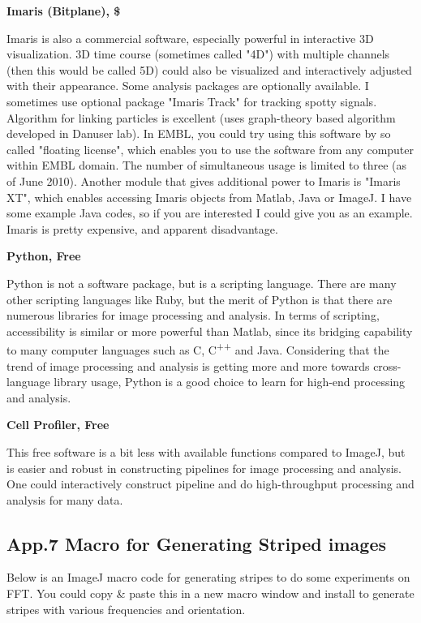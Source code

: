 \textbf{Imaris (Bitplane), \$}



Imaris is also a commercial software, especially powerful in interactive
3D visualization. 3D time course (sometimes called
"4D") with multiple channels (then
this would be called 5D) could also be visualized and interactively
adjusted with their appearance. Some analysis packages are optionally
available. I sometimes use optional package "Imaris
Track" for tracking spotty signals. Algorithm for
linking particles is excellent (uses graph-theory based algorithm
developed in Danuser lab). In EMBL, you could try using this software
by so called "floating license",
which enables you to use the software from any computer within EMBL
domain. The number of simultaneous usage is limited to three (as of
June 2010). Another module that gives additional power to Imaris is
"Imaris XT", which enables
accessing Imaris objects from Matlab, Java or ImageJ. I have some
example Java codes, so if you are interested I could give you as an
example. Imaris is pretty expensive, and apparent disadvantage. 



\textbf{Python, Free}

Python is not a software package, but is a scripting language. There are
many other scripting languages like Ruby, but the merit of Python is
that there are numerous libraries for image processing and analysis. In
terms of scripting, accessibility is similar or more powerful than
Matlab, since its bridging capability to many computer languages such
as C, C\textsuperscript{++} and Java. Considering that the trend of
image processing and analysis is getting more and more towards
cross-language library usage, Python is a good choice to learn for
high-end processing and analysis.

\textbf{Cell Profiler, Free}

This free software is a bit less with available functions compared to
ImageJ, but is easier and robust in constructing pipelines for image
processing and analysis. One could interactively construct pipeline and
do high-throughput processing and analysis for many data. 



\clearpage
\subsection{App.7 Macro for Generating Striped images}
\label{app7}

Below is an ImageJ macro code for generating stripes to do some
experiments on FFT. You could copy \& paste this in a new macro window
and install to generate stripes with various frequencies and orientation.  

